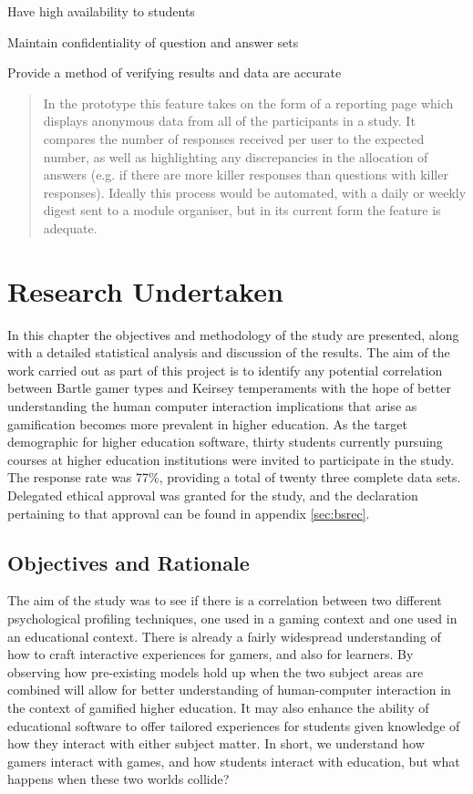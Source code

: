 \documentclass[12pt,a4paper,twoside]{report}
\begin{document}
Have high availability to students
\begin{quote}
	
\end{quote}
Maintain confidentiality of question and answer sets
\begin{quote}
\end{quote}
Provide a method of verifying results and data are accurate
\begin{quote}
	In the prototype this feature takes on the form of a reporting page which displays anonymous data from all of the participants in a study. It compares the number of responses received per user to the expected number, as well as highlighting any discrepancies in the allocation of answers (e.g. if there are more killer responses than questions with killer responses). Ideally this process would be automated, with a daily or weekly digest sent to a module organiser, but in its current form the feature is adequate.
\end{quote}

\chapter{Research Undertaken}
\label{sec:research}
In this chapter the objectives and methodology of the study are presented, along with a detailed statistical analysis and discussion of the results. The aim of the work carried out as part of this project is to identify any potential correlation between Bartle gamer types and Keirsey temperaments with the hope of better understanding the human computer interaction implications that arise as gamification becomes more prevalent in higher education. As the target demographic for higher education software, thirty students currently pursuing courses at higher education institutions were invited to participate in the study. The response rate was 77\%, providing a total of twenty three complete data sets. Delegated ethical approval was granted for the study, and the declaration pertaining to that approval can be found in appendix \ref{sec:bsrec}.

\section{Objectives and Rationale}
The aim of the study was to see if there is a correlation between two different psychological profiling techniques, one used in a gaming context and one used in an educational context. There is already a fairly widespread understanding of how to craft interactive experiences for gamers, and also for learners. By observing how pre-existing models hold up when the two subject areas are combined will allow for better understanding of human-computer interaction in the context of gamified higher education. It may also enhance the ability of educational software to offer tailored experiences for students given knowledge of how they interact with either subject matter. In short, we understand how gamers interact with games, and how students interact with education, but what happens when these two worlds collide?
\end{document}
